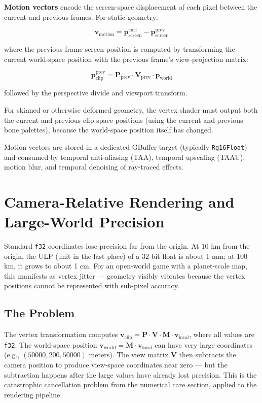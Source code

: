 \documentclass[
  11pt,
  letterpaper,
  DIV=11,
  numbers=noendperiod,
  twoside,
  open=right]{scrreprt}
\begin{document}
\textbf{Motion vectors} encode the screen-space displacement of each
pixel between the current and previous frames. For static geometry:

\[
\mathbf{v}_{\text{motion}} = \mathbf{p}_{\text{screen}}^{\text{curr}} - \mathbf{p}_{\text{screen}}^{\text{prev}}
\]

where the previous-frame screen position is computed by transforming the
current world-space position with the previous frame's view-projection
matrix:

\[
\mathbf{p}_{\text{clip}}^{\text{prev}} = \mathbf{P}_{\text{prev}} \cdot \mathbf{V}_{\text{prev}} \cdot \mathbf{p}_{\text{world}}
\]

followed by the perspective divide and viewport transform.

For skinned or otherwise deformed geometry, the vertex shader must
output both the current and previous clip-space positions (using the
current and previous bone palettes), because the world-space position
itself has changed.

Motion vectors are stored in a dedicated GBuffer target (typically
\texttt{Rg16Float}) and consumed by temporal anti-aliasing (TAA),
temporal upscaling (TAAU), motion blur, and temporal denoising of
ray-traced effects.

\section{Camera-Relative Rendering and Large-World
Precision}\label{camera-relative-rendering-and-large-world-precision}

Standard \texttt{f32} coordinates lose precision far from the origin. At
10 km from the origin, the ULP (unit in the last place) of a 32-bit
float is about 1 mm; at 100 km, it grows to about 1 cm. For an
open-world game with a planet-scale map, this manifests as vertex jitter
--- geometry visibly vibrates because the vertex positions cannot be
represented with sub-pixel accuracy.

\subsection{The Problem}\label{the-problem}

The vertex transformation computes
\(\mathbf{v}_{\text{clip}} = \mathbf{P} \cdot \mathbf{V} \cdot \mathbf{M} \cdot \mathbf{v}_{\text{local}}\),
where all values are \texttt{f32}. The world-space position
\(\mathbf{v}_{\text{world}} = \mathbf{M} \cdot \mathbf{v}_{\text{local}}\)
can have very large coordinates (e.g., \((50000, 200, 50000)\) meters).
The view matrix \(\mathbf{V}\) then subtracts the camera position to
produce view-space coordinates near zero --- but the subtraction happens
after the large values have already lost precision. This is the
catastrophic cancellation problem from the numerical care section,
applied to the rendering pipeline.
\end{document}
